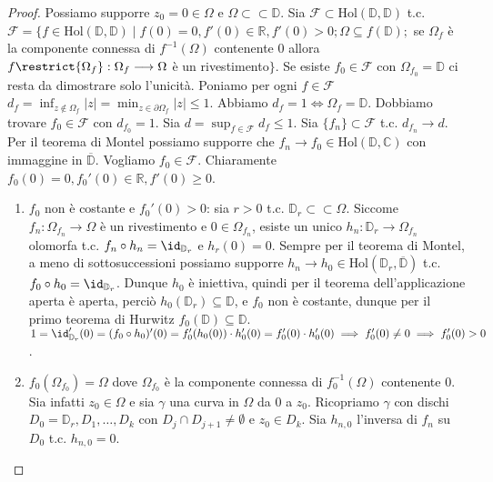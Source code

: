 \begin{proof}
  Possiamo supporre $z_0=0 \in \Omega$ e $\Omega \subset \subset \mathbb{D}$. Sia $\mathcal{F} \subset \text{Hol}(\mathbb{D}, \mathbb{D})$ t.c.
  $\mathcal{F}=\{f \in \text{Hol}(\mathbb{D}, \mathbb{D}) \mid f(0)=0, f'(0) \in \mathbb{R}, f'(0)>0; \Omega \subseteq f(\mathbb{D});$ se $\Omega_f$ è la componente connessa di $f^{-1}(\Omega)$ contenente $0$ allora $f\restrict{\Omega_f}:\Omega_f \longrightarrow \Omega$ è un rivestimento$\}$.
  Se esiste $f_0 \in \mathcal{F}$ con $\Omega_{f_0}=\mathbb{D}$ ci resta da dimostrare solo l'unicità. Poniamo per ogni $f \in \mathcal{F}$ $\displaystyle d_f=\inf_{z \not\in \Omega_f} |z|=\min_{z \in \partial\Omega_f} |z| \le 1$. Abbiamo $d_f=1 \iff \Omega_f=\mathbb{D}$.
  Dobbiamo trovare $f_0 \in \mathcal{F}$ con $d_{f_0}=1$. Sia $\displaystyle d=\sup_{f \in \mathcal{F}} d_f \le 1$. Sia $\{f_n\} \subset \mathcal{F}$ t.c. $d_{f_n} \longrightarrow d$.
  Per il teorema di Montel possiamo supporre che $f_n \longrightarrow f_0 \in \text{Hol}(\mathbb{D}, \mathbb{C})$ con immaggine in $\overline {\mathbb{D}}$. Vogliamo $f_0 \in \mathcal{F}$. Chiaramente $f_0(0)=0, f_0'(0) \in \mathbb{R}, f'(0) \ge 0$.
  \begin{enumerate}
    \item $f_0$ non è costante e $f_0'(0)>0$: sia $r>0$ t.c. $\mathbb{D}_r \subset \subset \Omega$. Siccome $f_n:\Omega_{f_n} \longrightarrow \Omega$ è un rivestimento e $0 \in \Omega_{f_n}$, esiste un unico $h_n:\mathbb{D}_r \longrightarrow \Omega_{f_n}$ olomorfa t.c. $f_n \circ h_n=\id_{\mathbb{D}_r}$ e $h_r(0)=0$.
    Sempre per il teorema di Montel, a meno di sottosuccessioni possiamo supporre $h_n \longrightarrow h_0 \in \text{Hol}(\mathbb{D}_r, \overline{\mathbb{D}})$ t.c. $f_0 \circ h_0=\id_{\mathbb{D}_r}$.
    Dunque $h_0$ è iniettiva, quindi per il teorema dell'applicazione aperta è aperta, perciò $h_0(\mathbb{D}_r) \subseteq \mathbb{D}$, e $f_0$ non è costante, dunque per il primo teorema di Hurwitz $f_0(\mathbb{D}) \subseteq \mathbb{D}$. $1=\id_{\mathbb{D}_r}'(0)=(f_0 \circ h_0)'(0)=f_0'(h_0(0))\cdot h_0'(0)=f_0'(0) \cdot h_0'(0) \implies f_0'(0) \not=0 \implies f_0'(0)>0$.
    \item $f_0(\Omega_{f_0})=\Omega$ dove $\Omega_{f_0}$ è la componente connessa di $f_0^{-1}(\Omega)$ contenente $0$. Sia infatti $z_0 \in \Omega$ e sia $\gamma$ una curva in $\Omega$ da $0$ a $z_0$.
    Ricopriamo $\gamma$ con dischi $D_0=\mathbb{D}_r, D_1, \dots, D_k$ con $D_j \cap D_{j+1} \not=\emptyset$ e $z_0 \in D_k$. Sia $h_{n, 0}$ l'inversa di $f_n$ su $D_0$ t.c. $h_{n,0}=0$.

\end{enumerate}
\end{proof}

